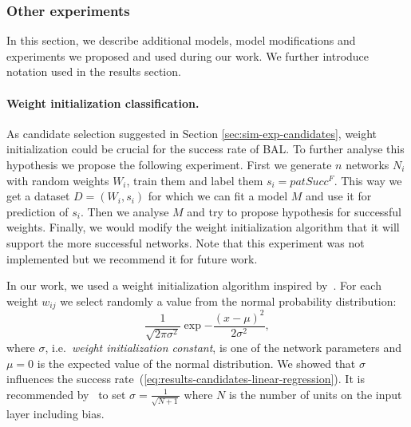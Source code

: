 \subsubsection{Other experiments}

In this section, we describe additional models, model modifications and experiments we proposed and used during our work. We further introduce notation used in the results section. 

\paragraph{Weight initialization classification.} 
\label{sec:our-weight-init-class}
As candidate selection suggested in Section \ref{sec:sim-exp-candidates}, weight initialization could be crucial for the success rate of BAL. To further analyse this hypothesis we propose the following experiment. First we generate $n$ networks $N_i$ with random weights $W_i$, train them and label them $s_i = patSucc^F$. This way we get a dataset $D=(W_i, s_i)$ for which we can fit a model $M$ and use it for prediction of $s_i$. Then we analyse $M$ and try to propose hypothesis for successful weights. Finally, we would modify the weight initialization algorithm that it will support the more successful networks. Note that this experiment was not implemented but we recommend it for future work. 

\label{sec:our-sigma} 

In our work, we used a weight initialization algorithm inspired by~\citet{o1996bio}. For each weight $w_{ij}$ we select randomly a value from the normal probability distribution:
\begin{equation} 
  \frac{1}{\sqrt{2\pi \sigma^2}} \exp{-\frac{(x-\mu)^2}{2\sigma^2}},
  \label{eq:our-sigma} 
\end{equation} 
where $\sigma$, i.e.~\emph{weight initialization constant}, is one of the network parameters and $\mu = 0$ is the expected value of the normal distribution. We showed that $\sigma$ influences the success rate~(\ref{eq:results-candidates-linear-regression}). It is recommended by~\citet{o1996bio} to set $\sigma=\frac{1}{\sqrt{N + 1}}$ where $N$ is the number of units on the input layer including bias.


